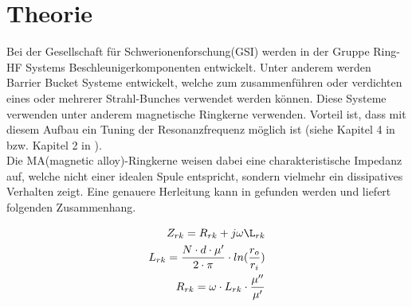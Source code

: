 \section{Theorie}

Bei der Gesellschaft für Schwerionenforschung(GSI) werden in der Gruppe Ring-HF Systems Beschleunigerkomponenten entwickelt. Unter anderem werden Barrier Bucket Systeme entwickelt, welche zum zusammenf\"uhren oder verdichten eines oder mehrerer Strahl-Bunches verwendet werden k\"onnen. Diese Systeme verwenden unter anderem magnetische Ringkerne verwenden. Vorteil ist, dass mit diesem Aufbau ein Tuning der Resonanzfrequenz m\"oglich ist (siehe Kapitel 4 in \cite{Klingbeil2015} bzw. Kapitel 2 in \cite{bast2017ba}).\\

Die MA(magnetic alloy)-Ringkerne weisen dabei eine charakteristische Impedanz auf, welche nicht einer idealen Spule entspricht, sondern vielmehr ein dissipatives Verhalten zeigt. Eine genauere Herleitung kann in \cite{Klingbeil2015} gefunden werden und liefert folgenden Zusammenhang. 

\begin{align}
Z_{rk} = R_{rk} + j\omega \L_{rk}\\
L_{rk} = \frac{N\cdot d\cdot\mu^\prime}{2\cdot\pi}\cdot ln(\frac{r_o}{r_i})\\
R_{rk} = \omega\cdot L_{rk}\cdot\frac{\mu^{\prime\prime}}{\mu^{\prime}}
\end{align}

 